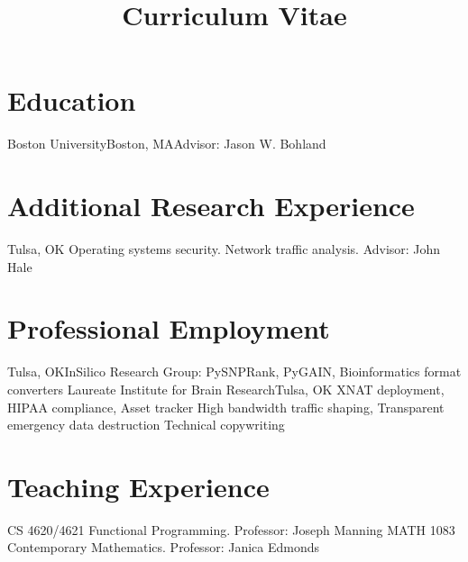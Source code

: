 \documentclass[11pt,letterpaper,sans]{moderncv}
\title{Curriculum Vitae}
\begin{document}
\makecvtitle

\section{Education}
%
    {Boston University}{Boston, MA}{}{Advisor: Jason W. Bohland}

\section{Additional Research Experience}
%
    {Tulsa, OK}{}%
    {Operating systems security. Network traffic analysis. Advisor: John Hale}

\section{Professional Employment}
%
    {Tulsa, OK}{}{InSilico Research Group: PySNPRank, PyGAIN, Bioinformatics format converters}
%
    {Laureate Institute for Brain Research}{Tulsa, OK}{}%
    {XNAT deployment, HIPAA compliance, Asset tracker}
%
    {High bandwidth traffic shaping, Transparent emergency data destruction}
%
    {Technical copywriting}

\section{Teaching Experience}
%
    {CS 4620/4621 Functional Programming. Professor: Joseph Manning}
%
    {MATH 1083 Contemporary Mathematics. Professor: Janica Edmonds}
\end{document}
